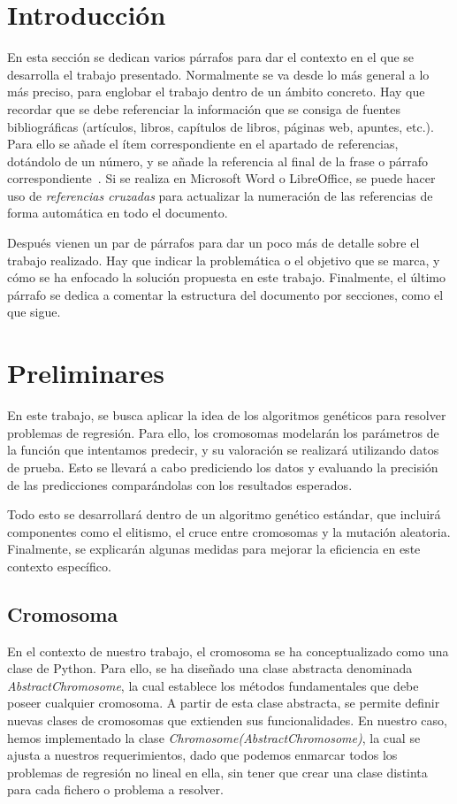 \documentclass[conference,a4paper]{IEEEtran}
\begin{document}
\section{Introducción}

En esta sección se dedican varios párrafos para dar el contexto en el que se
desarrolla el trabajo presentado. Normalmente se va desde lo más general a lo
más preciso, para englobar el trabajo dentro de un ámbito concreto. Hay que
recordar que se debe referenciar la información que se consiga de fuentes
bibliográficas (artículos, libros, capítulos de libros, páginas web, apuntes,
etc.). Para ello se añade el ítem correspondiente en el apartado de
referencias, dotándolo de un número, y se añade la referencia al final de la
frase o párrafo correspondiente~\cite{b1}. Si se realiza en Microsoft Word o
LibreOffice, se puede hacer uso de \emph{referencias cruzadas} para actualizar
la numeración de las referencias de forma automática en todo el documento.

Después vienen un par de párrafos para dar un poco más de detalle sobre el
trabajo realizado. Hay que indicar la problemática o el objetivo que se marca,
y cómo se ha enfocado la solución propuesta en este trabajo. Finalmente, el
último párrafo se dedica a comentar la estructura del documento por secciones,
como el que sigue.

\section{Preliminares}

En este trabajo, se busca aplicar la idea de los algoritmos genéticos para resolver problemas de regresión. Para ello, los cromosomas modelarán los parámetros de la función que intentamos predecir, y su valoración se realizará utilizando datos de prueba. Esto se llevará a cabo prediciendo los datos y evaluando la precisión de las predicciones comparándolas con los resultados esperados.

Todo esto se desarrollará dentro de un algoritmo genético estándar, que incluirá componentes como el elitismo, el cruce entre cromosomas y la mutación aleatoria. Finalmente, se explicarán algunas medidas para mejorar la eficiencia en este contexto específico.

\subsection{Cromosoma}

En el contexto de nuestro trabajo, el cromosoma se ha conceptualizado como una clase de Python. Para ello, se ha diseñado una clase abstracta denominada \textit{AbstractChromosome}, la cual establece los métodos fundamentales que debe poseer cualquier cromosoma. A partir de esta clase abstracta, se permite definir nuevas clases de cromosomas que extienden sus funcionalidades. En nuestro caso, hemos implementado la clase \textit{Chromosome(AbstractChromosome)}, la cual se ajusta a nuestros requerimientos, dado que podemos enmarcar todos los problemas de regresión no lineal en ella, sin tener que crear una clase distinta para cada fichero o problema a resolver.
\end{document}
